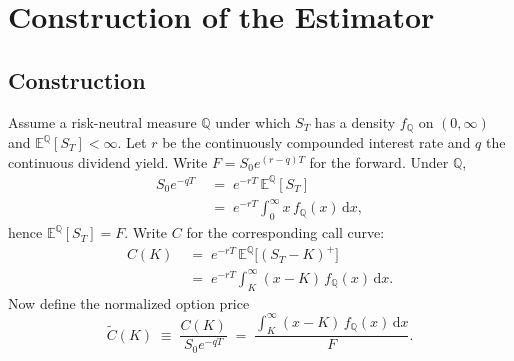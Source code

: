 \documentclass[preprint,12pt,authoryear,times]{elsarticle}
\newcommand{\E}{\mathbb{E}}
\newcommand{\Q}{\mathbb{Q}}
\begin{document}
\section{Construction of the Estimator}
\label{sec:est}

\subsection{Construction}
\label{sec:construct}

Assume a risk-neutral measure \(\Q\) under which \(S_T\) has a density \(f_{\Q}\) on \((0,\infty)\) and \(\E^{\Q}[S_T]<\infty\). Let \(r\) be the continuously compounded interest rate and \(q\) the continuous dividend yield. Write \(F=S_0e^{(r-q)T}\) for the forward. Under \(\Q\),
\begin{align}
S_0e^{-qT}
&\;=\;
e^{-rT}\,\E^{\Q}[S_T]
\nonumber\\
&\;=\;
e^{-rT}\int_{0}^{\infty}x\,f_{\Q}(x)\,\mathrm{d}x,
\label{eq:S0}
\end{align}
hence \(\E^{\Q}[S_T]=F\). Write \(C\) for the corresponding call curve:
\begin{align}
C(K)
&\;=\;
e^{-rT}\,\E^{\Q}\bigl[(S_T-K)^+\bigr]
\nonumber\\
&\;=\;
e^{-rT}\int_K^{\infty}(x-K)\,f_{\Q}(x)\,\mathrm{d}x.
\label{eq:C}
\end{align}
Now define the normalized option price
\begin{equation}
\label{eq:Ctil}
\tilde C(K)
\;\equiv\;
\frac{C(K)}{S_0e^{-qT}}
\;=\;
\frac{\displaystyle\int_K^{\infty}(x-K)\,f_{\Q}(x)\,\mathrm{d}x}{F}.
\end{equation}
\end{document}
